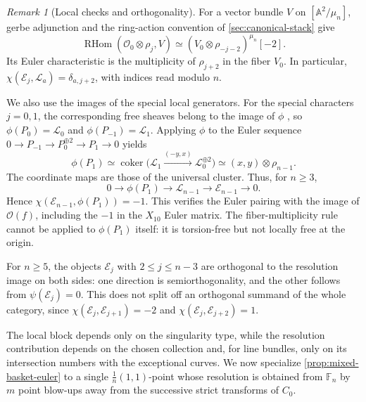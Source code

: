 \documentclass[11pt]{article}
\theoremstyle{plain}
\theoremstyle{definition}
\theoremstyle{remark}
\newtheorem{remark}[remark]{Remark}
\newcommand{\A}{\mathbb A}
\newcommand{\F}{\mathbb F}
\newcommand{\RHom}{\operatorname{RHom}}
\newcommand{\OO}{\mathcal O}
\begin{document}
\begin{remark}[Local checks and orthogonality]
\label{rem:local-euler-check}
For a vector bundle \(V\) on \([\A^2/\mu_n]\), gerbe adjunction
and the ring-action convention of \cref{sec:canonical-stack} give
\[
\RHom(\OO_0\otimes\rho_j,V)
\simeq (V_0\otimes\rho_{-j-2})^{\mu_n}[-2].
\]
Its Euler characteristic is the multiplicity of \(\rho_{j+2}\) in
the fiber \(V_0\). In particular,
\(\chi(\mathcal E_j,\mathcal L_a)=\delta_{a,j+2}\), with
indices read modulo \(n\).

We also use the images of the special local generators. For the special
characters \(j=0,1\), the corresponding free sheaves belong to the image of
\(\phi\) \cite[Proposition~1.1]{Ishii2015}, so
\(\phi(P_0)=\mathcal L_0\) and \(\phi(P_{-1})=\mathcal L_1\).
Applying \(\phi\) to the Euler sequence
\(0\to P_{-1}\to P_0^{\oplus2}\to P_1\to0\) yields
\[
\phi(P_1)\simeq
\operatorname{coker}\bigl(\mathcal L_1
\xrightarrow{(-y,x)}\mathcal L_0^{\oplus2}\bigr)
\simeq (x,y)\otimes\rho_{n-1}.
\]
The coordinate maps are those of the universal cluster. Thus, for
\(n\geq3\),
\[
0\longrightarrow\phi(P_1)\longrightarrow\mathcal L_{n-1}
\longrightarrow\mathcal E_{n-1}\longrightarrow0.
\]
Hence \(\chi(\mathcal E_{n-1},\phi(P_1))=-1\).
This verifies the Euler pairing with the image of \(\OO(f)\), including the
\(-1\) in the \(X_{10}\) Euler matrix. The fiber-multiplicity rule cannot
be applied to \(\phi(P_1)\) itself: it is torsion-free but not locally free
at the origin.

For \(n\geq5\), the objects \(\mathcal E_j\) with
\(2\leq j\leq n-3\) are orthogonal to the resolution image on both
sides: one direction is semiorthogonality, and the other follows from
\(\psi(\mathcal E_j)=0\). This does not split off an orthogonal
summand of the whole category, since
\(\chi(\mathcal E_j,\mathcal E_{j+1})=-2\) and
\(\chi(\mathcal E_j,\mathcal E_{j+2})=1\).
\end{remark}

The local block depends only on the singularity type, while the resolution
contribution depends on the chosen collection and, for line bundles, only
on its intersection numbers with the exceptional curves. We now
specialize \cref{prop:mixed-basket-euler} to a single
\(\frac1n(1,1)\)-point whose resolution is obtained from \(\F_n\) by
\(m\) point blow-ups away from the successive strict transforms of
\(C_0\).
\end{document}
